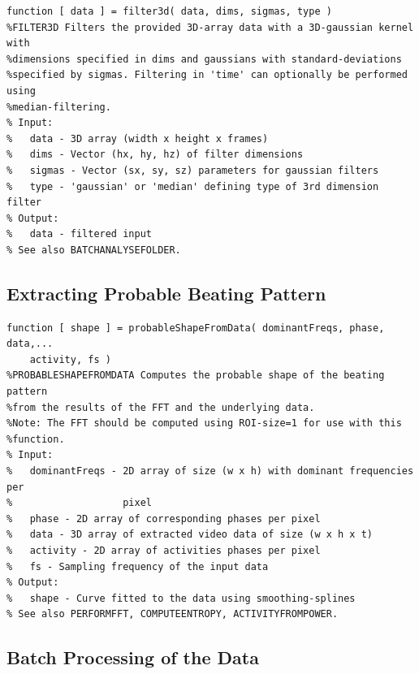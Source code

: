\documentclass[11pt]{scrartcl}
\begin{document}
\begin{minipage}{\linewidth}
  \begin{lstlisting}[caption={Function performing the noise removal.}, label=list:res]
function [ data ] = filter3d( data, dims, sigmas, type )
%FILTER3D Filters the provided 3D-array data with a 3D-gaussian kernel with
%dimensions specified in dims and gaussians with standard-deviations
%specified by sigmas. Filtering in 'time' can optionally be performed using
%median-filtering.
% Input:
%   data - 3D array (width x height x frames)
%   dims - Vector (hx, hy, hz) of filter dimensions
%   sigmas - Vector (sx, sy, sz) parameters for gaussian filters
%   type - 'gaussian' or 'median' defining type of 3rd dimension filter
% Output:
%   data - filtered input
% See also BATCHANALYSEFOLDER.
  \end{lstlisting}
\end{minipage}

\subsection{Extracting Probable Beating Pattern}

\begin{minipage}{\linewidth}
  \begin{lstlisting}[caption={Function for extracting the probable beating pattern.}, label=list:res]
function [ shape ] = probableShapeFromData( dominantFreqs, phase, data,...
    activity, fs )
%PROBABLESHAPEFROMDATA Computes the probable shape of the beating pattern 
%from the results of the FFT and the underlying data.
%Note: The FFT should be computed using ROI-size=1 for use with this 
%function.
% Input:
%   dominantFreqs - 2D array of size (w x h) with dominant frequencies per 
%                   pixel 
%   phase - 2D array of corresponding phases per pixel
%   data - 3D array of extracted video data of size (w x h x t)
%   activity - 2D array of activities phases per pixel
%   fs - Sampling frequency of the input data
% Output:
%   shape - Curve fitted to the data using smoothing-splines
% See also PERFORMFFT, COMPUTEENTROPY, ACTIVITYFROMPOWER.  
\end{lstlisting}
\end{minipage}


\subsection{Batch Processing of the Data}
\end{document}
